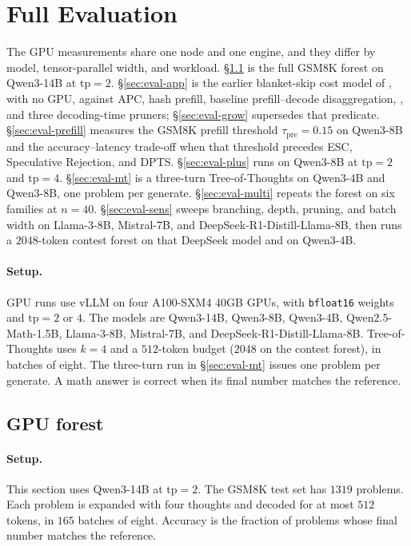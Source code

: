 \section{Full Evaluation}
\label{sec:eval-full}

The GPU measurements share one node and one engine, and they differ by model, tensor-parallel width, and workload.
\S\ref{sec:eval-gpu} is the full GSM8K forest on Qwen3-14B at $\mathrm{tp}{=}2$.
\S\ref{sec:eval-app} is the earlier blanket-skip cost model of \app, with no GPU, against APC, hash prefill, baseline prefill--decode disaggregation, \sys, and three decoding-time pruners; \S\ref{sec:eval-grow} supersedes that predicate.
\S\ref{sec:eval-prefill} measures the GSM8K prefill threshold $\tau_{\mathrm{pre}}{=}0.15$ on Qwen3-8B and the accuracy--latency trade-off when that threshold precedes ESC, Speculative Rejection, and DPTS.
\S\ref{sec:eval-plus} runs \plus on Qwen3-8B at $\mathrm{tp}{=}2$ and $\mathrm{tp}{=}4$.
\S\ref{sec:eval-mt} is a three-turn Tree-of-Thoughts on Qwen3-4B and Qwen3-8B, one problem per generate.
\S\ref{sec:eval-multi} repeats the forest on six families at $n{=}40$.
\S\ref{sec:eval-sens} sweeps branching, depth, pruning, and batch width on Llama-3-8B, Mistral-7B, and DeepSeek-R1-Distill-Llama-8B, then runs a $2048$-token contest forest on that DeepSeek model and on Qwen3-4B.

\paragraph{Setup.}
GPU runs use vLLM on four A100-SXM4 40GB GPUs, with \texttt{bfloat16} weights and $\mathrm{tp}{=}2$ or $4$.
The models are Qwen3-14B, Qwen3-8B, Qwen3-4B, Qwen2.5-Math-1.5B, Llama-3-8B, Mistral-7B, and DeepSeek-R1-Distill-Llama-8B.
Tree-of-Thoughts uses $k{=}4$ and a $512$-token budget ($2048$ on the contest forest), in batches of eight.
The three-turn run in \S\ref{sec:eval-mt} issues one problem per generate.
A math answer is correct when its final number matches the reference.

\subsection{GPU forest}
\label{sec:eval-gpu}

\paragraph{Setup.}
This section uses Qwen3-14B at $\mathrm{tp}{=}2$.
The GSM8K test set has $1319$ problems.
Each problem is expanded with four thoughts and decoded for at most $512$ tokens, in $165$ batches of eight.
Accuracy is the fraction of problems whose final number matches the reference.

